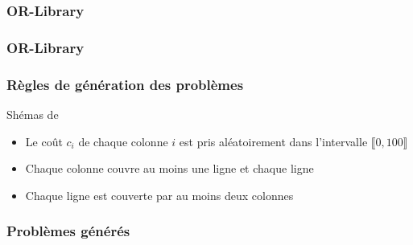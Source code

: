 \documentclass[aspectratio=169,11pt]{beamer}
\begin{document}
	\begin{frame}
		\frametitle{OR-Library}
		\centering\resizebox{0.85\linewidth}{!}{}
	\end{frame}
	\begin{frame}
		\frametitle{OR-Library}
		\hfill%
		\begin{minipage}{0.24\linewidth}
			\resizebox{\linewidth}{!}{}%
		\end{minipage}
		\hfill%
		\begin{minipage}{0.24\linewidth}
			\resizebox{\linewidth}{!}{}%
		\end{minipage}
		\hfill\hspace{0pt}
	\end{frame}
	\begin{frame}
		\frametitle{Règles de génération des problèmes}
		\begin{block}{Shémas de \citeauthor{Balas1980}}
			\begin{itemize}
				\item Le coût \(c_i\) de chaque colonne \(i\) est pris aléatoirement dans l'intervalle \(\llbracket0,100\rrbracket\)
				\item Chaque colonne couvre au moins une ligne et chaque ligne
				\item Chaque ligne est couverte par au moins deux colonnes
			\end{itemize}
		\end{block}
	\end{frame}
	\begin{frame}
		\frametitle{Problèmes générés}
		\hfill%
		\begin{minipage}{0.21\linewidth}
			\resizebox{\linewidth}{!}{}%
		\end{minipage}
		\hfill%
		\begin{minipage}{0.21\linewidth}
			\resizebox{\linewidth}{!}{}%
		\end{minipage}
		\hfill%
		\begin{minipage}{0.21\linewidth}
			\resizebox{\linewidth}{!}{}%
		\end{minipage}
		\hfill%
		\begin{minipage}{0.21\linewidth}
			\resizebox{\linewidth}{!}{}%
		\end{minipage}
		\hfill\hspace{0pt}
	\end{frame}
\end{document}
